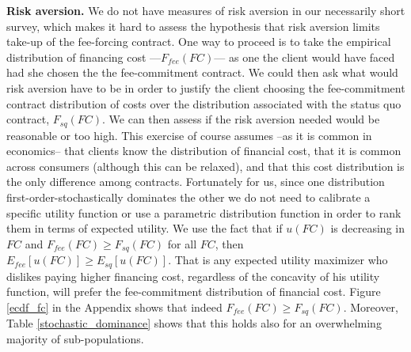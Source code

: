 \documentclass[11pt]{article}
\begin{document}
\vspace{.1in}
\noindent \textbf{Risk aversion.} We do not have measures of risk aversion in our necessarily short survey, which makes it hard to assess the hypothesis that risk aversion limits take-up of the fee-forcing contract. One way to proceed is to take the empirical distribution of financing cost ---$F_{fee}(FC)$--- as one the client would have faced had she chosen the the fee-commitment contract. We could then ask what would risk aversion have to be in order to justify the client choosing the fee-commitment contract distribution of costs over the distribution associated with the status quo contract, $F_{sq}(FC)$. We can then assess if the risk aversion needed would be reasonable or too high. This exercise of course assumes --as it is common in economics-- that clients know the distribution of financial cost, that it is common across consumers (although this can be relaxed), and that this cost distribution is the only difference among contracts. Fortunately for us, since one distribution first-order-stochastically dominates the other we do not need to calibrate a specific utility function or use a parametric distribution function in order to rank them in terms of expected utility. We use the fact that if $u(FC)$ is decreasing in $FC$ and $F_{fee}(FC) \geq F_{sq}(FC)$ for all $FC$, then $E_{fee}[u(FC)] \geq E_{sq}[u(FC)]$. That is any expected utility maximizer who dislikes paying higher financing cost, regardless of the concavity of his utility function, will prefer the fee-commitment distribution of financial cost.  Figure \ref{ecdf_fc} in the Appendix shows that indeed $F_{fee}(FC) \geq F_{sq}(FC)$. Moreover, Table \ref{stochastic_dominance} shows that this holds also for an overwhelming majority of sub-populations.

\end{document}
